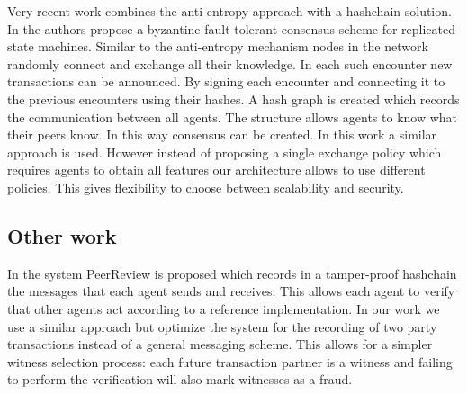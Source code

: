Very recent work combines the anti-entropy approach with a hashchain solution. In \cite{baird2016swirlds}
the authors propose a byzantine fault tolerant consensus scheme for replicated state machines. Similar
to the anti-entropy mechanism nodes in the network randomly connect and exchange all their knowledge. In each
such encounter new transactions can be announced. By signing each encounter and connecting it to the
previous encounters using their hashes. A hash graph is created which records the communication 
between all agents. The structure allows agents to know what their peers know. In this way consensus
can be created. In this work a similar approach is used. However instead of proposing a single 
exchange policy which requires agents to obtain all features our architecture allows to use different
policies. This gives flexibility to choose between scalability and security.


\subsection{Other work}
In \cite{haeberlen2007peerreview} the system PeerReview is proposed which records in a tamper-proof
hashchain the messages that each agent sends and receives. This allows each agent to verify that 
other agents act according to a reference implementation. In our work we use a similar approach but
optimize the system for the recording of two party transactions instead of a general messaging scheme.
This allows for a simpler witness selection process: each future transaction partner is a witness and
failing to perform the verification will also mark witnesses as a fraud.





